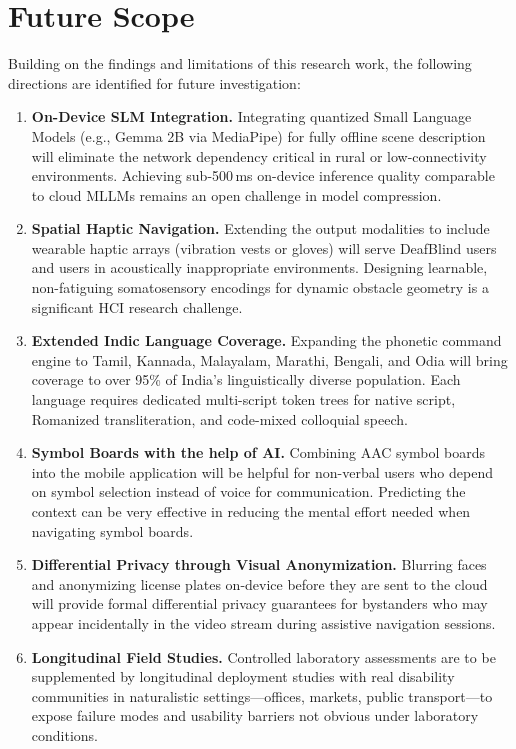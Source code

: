 \documentclass[pdflatex,sn-mathphys-num]{sn-jnl}
\theoremstyle{thmstyleone}%
\theoremstyle{thmstyletwo}%
\theoremstyle{thmstylethree}%
\begin{document}
\section{Future Scope}\label{sec:future}

Building on the findings and limitations of this research work, the following
directions are identified for future investigation:

\begin{enumerate}

\item \textbf{On-Device SLM Integration.} Integrating quantized Small Language
Models (e.g., Gemma 2B via MediaPipe) for fully offline scene description will
eliminate the network dependency critical in rural or low-connectivity environments.
Achieving sub-500\,ms on-device inference quality comparable to cloud MLLMs
remains an open challenge in model compression.

\item \textbf{Spatial Haptic Navigation.} Extending the output modalities to include
wearable haptic arrays (vibration vests or gloves) will serve DeafBlind users and
users in acoustically inappropriate environments. Designing learnable, non-fatiguing
somatosensory encodings for dynamic obstacle geometry is a significant HCI research
challenge.

\item \textbf{Extended Indic Language Coverage.} Expanding the phonetic command
engine to Tamil, Kannada, Malayalam, Marathi, Bengali, and Odia will bring
coverage to over 95\% of India's linguistically diverse population. Each language
requires dedicated multi-script token trees for native script, Romanized
transliteration, and code-mixed colloquial speech.

\item \textbf{Symbol Boards with the help of AI.} Combining AAC symbol boards
into the mobile application will be helpful for non-verbal users who depend on symbol
selection instead of voice for communication. Predicting the context can be very effective
in reducing the mental effort needed when navigating symbol boards.

\item \textbf{Differential Privacy through Visual Anonymization.}
Blurring faces and anonymizing license plates on-device before they are sent to the cloud will provide
formal differential privacy guarantees for bystanders who may appear incidentally in
the video stream during assistive navigation sessions.

\item \textbf{Longitudinal Field Studies.} Controlled laboratory assessments are to be
supplemented by longitudinal deployment studies with real disability communities
in naturalistic settings---offices, markets, public transport---to expose
failure modes and usability barriers not obvious under laboratory conditions.

\end{enumerate}
\end{document}
